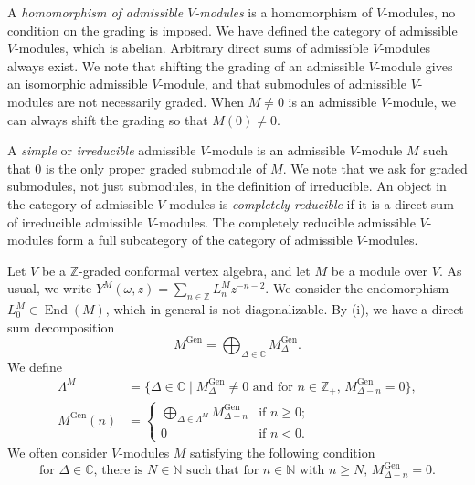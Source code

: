 \documentclass[a4paper, 12pt, reqno]{amsart}
\theoremstyle{remark}
\DeclareMathOperator{\End}{End}
\DeclareMathOperator{\Gen}{Gen}
\begin{document}
A \emph{homomorphism of admissible $V$-modules} is a homomorphism of $V$-modules, no condition on the grading is imposed.
We have defined the category of admissible $V$-modules, which is abelian.
Arbitrary direct sums of admissible $V$-modules always exist.
We note that shifting the grading of an admissible $V$-module gives an isomorphic admissible $V$-module, and that submodules of admissible $V$-modules are not necessarily graded.
When $M \neq 0$ is an admissible $V$-module, we can always shift the grading so that $M(0) \neq 0$.

A \emph{simple} or \emph{irreducible} admissible $V$-module is an admissible $V$-module $M$ such that $0$ is the only proper graded submodule of $M$.
We note that we ask for graded submodules, not just submodules, in the definition of irreducible.
An object in the category of admissible $V$-modules is \emph{completely reducible} if it is a direct sum of irreducible admissible $V$-modules.
The completely reducible admissible $V$-modules form a full subcategory of the category of admissible $V$-modules.

Let $V$ be a $\mathbb{Z}$-graded conformal vertex algebra, and let $M$ be a module over $V$.
As usual, we write $Y^M(\omega, z) = \sum_{n \in \mathbb{Z}} L^M_nz^{-n - 2}$.
We consider the endomorphism $L^M_0 \in \End(M)$, which in general is not diagonalizable.
By (i), we have a direct sum decomposition
\begin{equation*}
  M^{\Gen} = \bigoplus_{\Delta \in \mathbb{C}}M^{\Gen}_{\Delta}.
\end{equation*}
We define
\begin{equation}
  \label{eq:29}
  \begin{split}
    \Lambda^M &= \{\Delta \in \mathbb{C} \mid \text{$M^{\Gen}_{\Delta} \neq 0$ and for $n \in \mathbb{Z}_+$, $M^{\Gen}_{\Delta - n} = 0$}\}, \\
    M^{\Gen}(n) &=
                  \begin{cases}
                    \bigoplus_{\Delta \in \Lambda^M}M^{\Gen}_{\Delta + n} &\text{if $n \ge 0$}; \\
                    0 &\text{if $n < 0$}.
                  \end{cases}
  \end{split}
\end{equation}
We often consider $V$-modules $M$ satisfying the following condition
\begin{equation}
  \label{eq:30}
  \text{for $\Delta \in \mathbb{C}$, there is $N \in \mathbb{N}$ such that for $n \in \mathbb{N}$ with $n \ge N$, $M^{\Gen}_{\Delta - n} = 0$}.
\end{equation}
\end{document}
